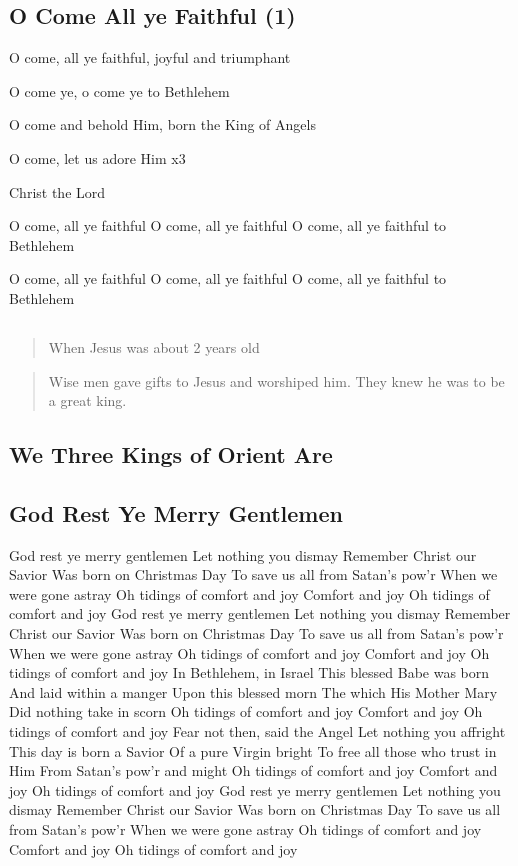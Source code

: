\documentclass[
  letterpaper,
  DIV=11,
  numbers=noendperiod]{scrartcl}
\begin{document}
\subsection{O Come All ye Faithful (1)}\label{o-come-all-ye-faithful-1}

O come, all ye faithful, joyful and triumphant

O come ye, o come ye to Bethlehem

O come and behold Him, born the King of Angels

O come, let us adore Him x3

Christ the Lord

O come, all ye faithful O come, all ye faithful O come, all ye faithful
to Bethlehem

O come, all ye faithful O come, all ye faithful O come, all ye faithful
to Bethlehem

\subsection{}\label{section-3}

\begin{quote}
When Jesus was about 2 years old
\end{quote}

\begin{quote}
Wise men gave gifts to Jesus and worshiped him. They knew he was to be a
great king.
\end{quote}

\subsection{We Three Kings of Orient
Are}\label{we-three-kings-of-orient-are}

\subsection{God Rest Ye Merry
Gentlemen}\label{god-rest-ye-merry-gentlemen}

God rest ye merry gentlemen Let nothing you dismay Remember Christ our
Savior Was born on Christmas Day To save us all from Satan's pow'r When
we were gone astray Oh tidings of comfort and joy Comfort and joy Oh
tidings of comfort and joy God rest ye merry gentlemen Let nothing you
dismay Remember Christ our Savior Was born on Christmas Day To save us
all from Satan's pow'r When we were gone astray Oh tidings of comfort
and joy Comfort and joy Oh tidings of comfort and joy In Bethlehem, in
Israel This blessed Babe was born And laid within a manger Upon this
blessed morn The which His Mother Mary Did nothing take in scorn Oh
tidings of comfort and joy Comfort and joy Oh tidings of comfort and joy
Fear not then, said the Angel Let nothing you affright This day is born
a Savior Of a pure Virgin bright To free all those who trust in Him From
Satan's pow'r and might Oh tidings of comfort and joy Comfort and joy Oh
tidings of comfort and joy God rest ye merry gentlemen Let nothing you
dismay Remember Christ our Savior Was born on Christmas Day To save us
all from Satan's pow'r When we were gone astray Oh tidings of comfort
and joy Comfort and joy Oh tidings of comfort and joy
\end{document}
